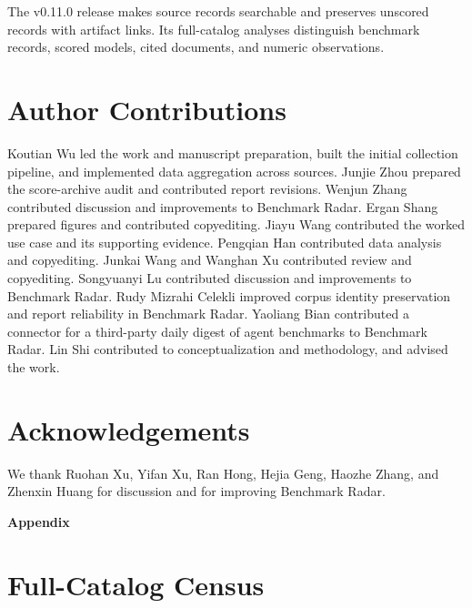 \documentclass[11pt]{article}
\newcommand{\ReportNumber}[1]{\pgfmathprintnumber[fixed,precision=0,1000 sep={,},assume math mode=true]{#1}}
\begin{document}
The v0.11.0 release makes \ReportNumber{\CensusRecords} source records searchable and preserves \CensusNoScoreWithLinks{} unscored records with artifact links. Its full-catalog analyses distinguish benchmark records, scored models, cited documents, and numeric observations.

\section*{Author Contributions}
\label{sec:author-contributions}

Koutian Wu led the work and manuscript preparation, built the initial collection pipeline, and implemented data aggregation across sources. Junjie Zhou prepared the score-archive audit and contributed report revisions. Wenjun Zhang contributed discussion and improvements to Benchmark Radar. Ergan Shang prepared figures and contributed copyediting. Jiayu Wang contributed the worked use case and its supporting evidence. Pengqian Han contributed data analysis and copyediting. Junkai Wang and Wanghan Xu contributed review and copyediting. Songyuanyi Lu contributed discussion and improvements to Benchmark Radar. Rudy Mizrahi Celekli improved corpus identity preservation and report reliability in Benchmark Radar. Yaoliang Bian contributed a connector for a third-party daily digest of agent benchmarks to Benchmark Radar. Lin Shi contributed to conceptualization and methodology, and advised the work.

\section*{Acknowledgements}
\label{sec:acknowledgements}

We thank Ruohan Xu, Yifan Xu, Ran Hong, Hejia Geng, Haozhe Zhang, and Zhenxin Huang for discussion and for improving Benchmark Radar.

\begingroup
\small
\raggedright


\endgroup

\clearpage
\appendix
\begin{center}
{\LARGE\bfseries Appendix}
\end{center}
\vspace{0.75em}

\section{Full-Catalog Census}
\label{app:full-catalog}
\end{document}
